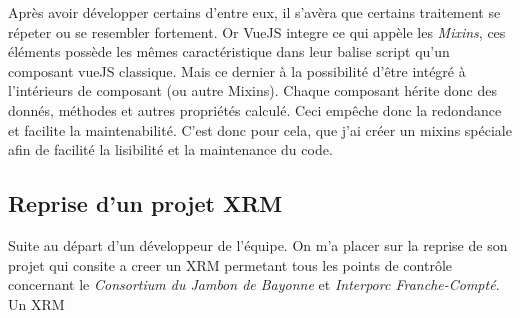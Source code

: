 Après avoir développer certains d'entre eux, il s'avèra que certains traitement se répeter ou se resembler fortement. Or VueJS integre ce qui appèle les \textit{Mixins}, ces éléments possède les mêmes caractéristique dans leur balise script qu'un composant vueJS classique. Mais ce dernier à la possibilité d'être intégré à l'intérieurs de composant (ou autre Mixins). Chaque composant hérite donc des donnés, méthodes et autres propriétés calculé. Ceci empêche donc la redondance et facilite la maintenabilité.
C'est donc pour cela, que j'ai créer un mixins spéciale afin de facilité la lisibilité et la maintenance du code. 


\subsection{Reprise d'un projet XRM}
Suite au départ d'un développeur de l'équipe. On m'a placer sur la reprise de son projet qui consite a creer un XRM permetant tous les points de contrôle concernant le \textit{Consortium du Jambon de Bayonne} et \textit{Interporc Franche-Compté}.
Un XRM 